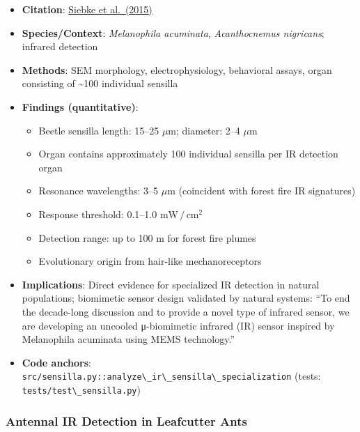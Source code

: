\documentclass[
  13pt,
  a4paperpaper,
  12pt]{article}
\newcommand{\passthrough}[1]{#1}
\providecommand{\tightlist}{%
  \setlength{\itemsep}{0pt}\setlength{\parskip}{0pt}}
\begin{document}
\begin{itemize}
\tightlist
\item
  \textbf{Citation}:
  \href{https://pubmed.ncbi.nlm.nih.gov/25822807/}{Siebke et al.~(2015)}
\item
  \textbf{Species/Context}: \emph{Melanophila acuminata},
  \emph{Acanthocnemus nigricans}; infrared detection
\item
  \textbf{Methods}: SEM morphology, electrophysiology, behavioral
  assays, organ consisting of \textasciitilde100 individual sensilla
\item
  \textbf{Findings (quantitative)}:

  \begin{itemize}
  \tightlist
  \item
    Beetle sensilla length: 15--25 \(\mu\mathrm{m}\); diameter: 2--4
    \(\mu\mathrm{m}\)
  \item
    Organ contains approximately 100 individual sensilla per IR
    detection organ
  \item
    Resonance wavelengths: 3--5 \(\mu\mathrm{m}\) (coincident with
    forest fire IR signatures)
  \item
    Response threshold: 0.1--1.0 \(\mathrm{mW}\,/\,\mathrm{cm}^2\)
  \item
    Detection range: up to 100 m for forest fire plumes
  \item
    Evolutionary origin from hair-like mechanoreceptors
  \end{itemize}
\item
  \textbf{Implications}: Direct evidence for specialized IR detection in
  natural populations; biomimetic sensor design validated by natural
  systems: ``To end the decade-long discussion and to provide a novel
  type of infrared sensor, we are developing an uncooled μ-biomimetic
  infrared (IR) sensor inspired by Melanophila acuminata using MEMS
  technology.''
\item
  \textbf{Code anchors}:
  \passthrough{\lstinline!src/sensilla.py::analyze\_ir\_sensilla\_specialization!}
  (tests: \passthrough{\lstinline!tests/test\_sensilla.py!})
\end{itemize}

\subsubsection{Antennal IR Detection in Leafcutter
Ants}\label{antennal-ir-detection-in-leafcutter-ants}
\end{document}
